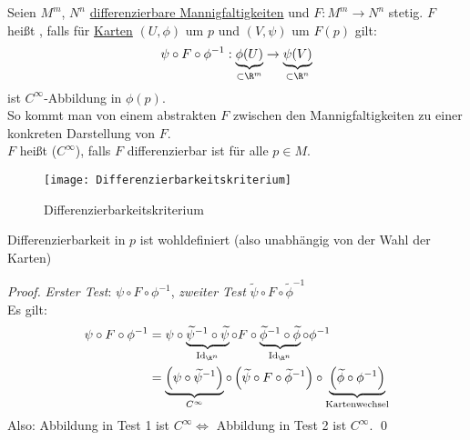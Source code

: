 \begin{definition}[Differenzierbarkeit]
  Seien \( M^m \), \( N^n \) \hyperref[def:dbmannigfaltigkeit]{differenzierbare Mannigfaltigkeiten} und \( F: M^m \to N^n \) stetig. \( F \) heißt \label{def:differenzierbar}, falls für \hyperref[def:karte]{Karten} \( (U, \phi) \) um \( p \) und \( (V, \psi) \) um \( F(p) \) gilt:
  \begin{equation*}
    \psi \circ F \circ \phi^{-1}: \underbrace{\phi(U)}_{\subset \R^m} \to \underbrace{\psi(V)}_{\subset \R^n}
  \end{equation*}
  ist \( C^\infty \)-Abbildung in \( \phi(p) \). \\
  So kommt man von einem abstrakten \( F \) zwischen den Mannigfaltigkeiten zu einer konkreten Darstellung von \( F \). \\
  \( F \) heißt  (\( C^\infty \)), falls \( F \) differenzierbar ist für alle \( p \in M \).
  \begin{figure}[H]
    \texttt{[image: Differenzierbarkeitskriterium]}
    \caption{Differenzierbarkeitskriterium}
  \end{figure}
\end{definition}

\begin{remark}
  Differenzierbarkeit in \( p \) ist wohldefiniert (also unabhängig von der Wahl der Karten)
  \begin{proof}
    \emph{Erster Test}: \( \psi \circ F \circ \phi^{-1} \), \emph{zweiter Test} \( \widetilde{\psi} \circ F \circ \widetilde{\phi}^{-1} \) \\
    Es gilt:
    \begin{align*}
      \psi \circ F \circ \phi^{-1} &= \psi \circ \underbrace{\widetilde{\psi}^{-1} \circ \widetilde{\psi}}_{\text{Id}_{\R^n}} \circ F \circ \underbrace{\widetilde{\phi}^{-1} \circ \widetilde{\phi}}_{\text{Id}_{\R^n}} \circ \phi^{-1} \\
        &= \underbrace{\left( \psi \circ \widetilde{\psi}^{-1} \right)}_{C^\infty} \circ \left( \widetilde{\psi} \circ F \circ \widetilde{\phi}^{-1} \right) \circ \underbrace{\left( \widetilde{\phi} \circ \phi^{-1} \right)}_{\text{Kartenwechsel}}
    \end{align*}
    Also: Abbildung in Test 1 ist \( C^\infty \Leftrightarrow \) Abbildung in Test 2 ist \( C^\infty \). \qed{}
  \end{proof}
\end{remark}

